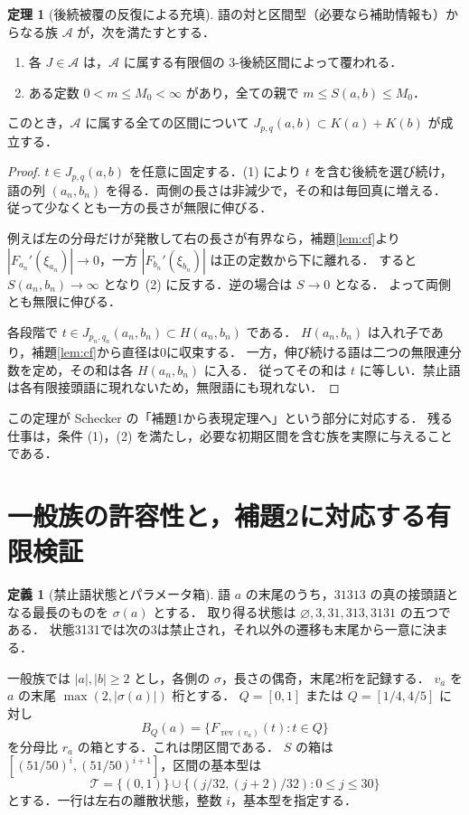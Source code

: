\documentclass[10pt,a4paper]{article}
\theoremstyle{definition}
\newtheorem{definition}{定義}
\newtheorem{theorem}{定理}
\newcommand{\eps}{\varnothing}
\newcommand{\A}{\mathcal A}
\begin{document}
\begin{theorem}[後続被覆の反復による充填]\label{thm:filling}
語の対と区間型（必要なら補助情報も）からなる族 $\A$ が，次を満たすとする．
\begin{enumerate}
 \item 各 $J\in\A$ は，$\A$ に属する有限個の $3$-後続区間によって覆われる．
 \item ある定数 $0<m\le M_0<\infty$ があり，全ての親で $m\le S(a,b)\le M_0$．
\end{enumerate}
このとき，$\A$ に属する全ての区間について
$J_{p,q}(a,b)\subset K(a)+K(b)$ が成立する．
\end{theorem}
\begin{proof}
$t\in J_{p,q}(a,b)$ を任意に固定する．(1) により $t$ を含む後続を選び続け，
語の列 $(a_n,b_n)$ を得る．両側の長さは非減少で，その和は毎回真に増える．
従って少なくとも一方の長さが無限に伸びる．

例えば左の分母だけが発散して右の長さが有界なら，補題\ref{lem:cf}より
$|F_{a_n}'(\xi_{a_n})|\to0$，一方 $|F_{b_n}'(\xi_{b_n})|$ は正の定数から下に離れる．
すると $S(a_n,b_n)\to\infty$ となり (2) に反する．逆の場合は $S\to0$ となる．
よって両側とも無限に伸びる．

各段階で $t\in J_{p_n,q_n}(a_n,b_n)\subset H(a_n,b_n)$ である．
$H(a_n,b_n)$ は入れ子であり，補題\ref{lem:cf}から直径は0に収束する．
一方，伸び続ける語は二つの無限連分数を定め，その和は各 $H(a_n,b_n)$ に入る．
従ってその和は $t$ に等しい．禁止語は各有限接頭語に現れないため，無限語にも現れない．
\end{proof}

この定理が Schecker の「補題1から表現定理へ」という部分に対応する．
残る仕事は，条件 (1)，(2) を満たし，必要な初期区間を含む族を実際に与えることである．

\section{一般族の許容性と，補題2に対応する有限検証}\label{sec:general}
\begin{definition}[禁止語状態とパラメータ箱]\label{def:state}
語 $a$ の末尾のうち，$31313$ の真の接頭語となる最長のものを $\sigma(a)$ とする．
取り得る状態は $\eps,3,31,313,3131$ の五つである．
状態3131では次の3は禁止され，それ以外の遷移も末尾から一意に決まる．

一般族では $|a|,|b|\ge2$ とし，各側の $\sigma$，長さの偶奇，末尾2桁を記録する．
$v_a$ を $a$ の末尾 $\max(2,|\sigma(a)|)$ 桁とする．
$Q=[0,1]$ または $Q=[1/4,4/5]$ に対し
\[
 B_Q(a)=\{F_{\operatorname{rev}(v_a)}(t):t\in Q\}
\]
を分母比 $r_a$ の箱とする．これは閉区間である．
$S$ の箱は $[(51/50)^i,(51/50)^{i+1}]$，区間の基本型は
\[
 \mathcal T=\{(0,1)\}\cup\{(j/32,(j+2)/32):0\le j\le30\}
\]
とする．一行は左右の離散状態，整数 $i$，基本型を指定する．
\end{definition}
\end{document}
